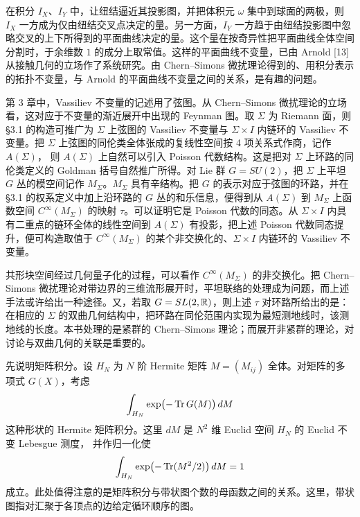 
在积分 $I_X$、$I_Y$ 中，让纽结逼近其投影图，并把体积元 $\omega$ 集中到球面的两极，则 $I_X$ 一方成为仅由纽结交叉点决定的量。另一方面，$I_Y$ 一方趋于由纽结投影图中忽略交叉的上下所得到的平面曲线决定的量。这个量在按奇异性把平面曲线全体空间分割时，于余维数 $1$ 的成分上取常值。这样的平面曲线不变量，已由 Arnold [13] 从接触几何的立场作了系统研究。由 Chern--Simons 微扰理论得到的、用积分表示的拓扑不变量，与 Arnold 的平面曲线不变量之间的关系，是有趣的问题。

第 3 章中，Vassiliev 不变量的记述用了弦图。从 Chern--Simons 微扰理论的立场看，这对应于不变量的渐近展开中出现的 Feynman 图。取 $\Sigma$ 为 Riemann 面，则 §3.1 的构造可推广为 $\Sigma$ 上弦图的 Vassiliev 不变量与 $\Sigma\times I$ 内链环的 Vassiliev 不变量。把 $\Sigma$ 上弦图的同伦类全体张成的复线性空间按 4 项关系式作商，记作 $A(\Sigma)$，
则 $A(\Sigma)$ 上自然可以引入 Poisson 代数结构。这是把对 $\Sigma$ 上环路的同伦类定义的 Goldman 括号自然推广所得。对 Lie 群 $G=SU(2)$，把 $\Sigma$ 上平坦 $G$ 丛的模空间记作 $M_{\Sigma}$。$M_{\Sigma}$ 具有辛结构。把 $G$ 的表示对应于弦图的环路，并在 §3.1 的权系定义中加上沿环路的 $G$ 丛的和乐信息，便得到从 $A(\Sigma)$ 到 $M_{\Sigma}$ 上函数空间 $C^{\infty}(M_{\Sigma})$ 的映射 $\tau$。可以证明它是 Poisson 代数的同态。从 $\Sigma\times I$ 内具有二重点的链环全体的线性空间到 $A(\Sigma)$ 有投影，把上述 Poisson 代数同态提升，便可构造取值于 $C^{\infty}(M_{\Sigma})$ 的某个非交换化的、$\Sigma\times I$ 内链环的 Vassiliev 不变量。


共形块空间经过几何量子化的过程，可以看作 $C^{\infty}(M_{\Sigma})$ 的非交换化。把 Chern--Simons 微扰理论对带边界的三维流形展开时，平坦联络的处理成为问题，而上述手法或许给出一种途径。又，若取 $G=SL(2,\mathbb{R})$，则上述 $\tau$ 对环路所给出的是：在相应的 $\Sigma$ 的双曲几何结构中，把环路在同伦范围内实现为最短测地线时，该测地线的长度。本书处理的是紧群的 Chern--Simons 理论；而展开非紧群的理论，对讨论与双曲几何的关联是重要的。


先说明矩阵积分。设 $H_N$ 为 $N$ 阶 Hermite 矩阵 $M=(M_{ij})$ 全体。对矩阵的多项式 $G(X)$，考虑
\[
  \int_{H_N}\exp\bigl(-\operatorname{Tr} G(M)\bigr)\,dM
\]
这种形状的 Hermite 矩阵积分。这里 $dM$ 是 $N^{2}$ 维 Euclid 空间 $H_N$ 的 Euclid 不变 Lebesgue 测度，
并作归一化使
\[
  \int_{H_N}\exp\bigl(-\operatorname{Tr}(M^{2}/2)\bigr)\,dM=1
\]
成立。此处值得注意的是矩阵积分与带状图个数的母函数之间的关系。这里，带状图指对汇聚于各顶点的边给定循环顺序的图。

